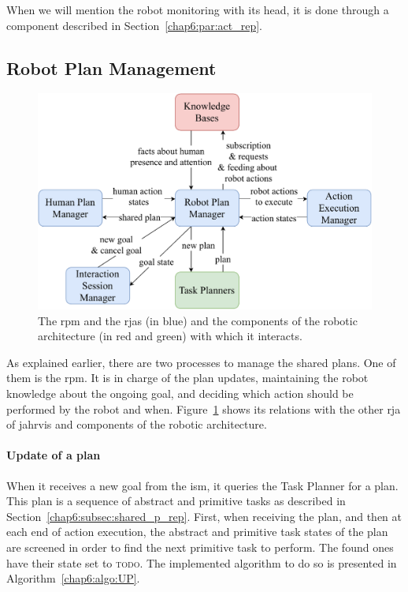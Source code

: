 \documentclass[a4paper,11pt,twoside]{StyleThese}
\begin{document}
When we will mention the robot monitoring with its head, it is done through a component described in Section~\ref{chap6:par:act_rep}.

\subsection{Robot Plan Management}\label{chap6:subsec:robot_plan}

\begin{figure}[!hbt]
	\centering
	\includegraphics[width=0.85\linewidth]{figures/chapter2/robot_manager_zoom.pdf}
	\caption{The \acrlong{rpm} and the \acrshort{rja}s (in blue) and the components of the robotic architecture (in red and green) with which it interacts.}
	\label{chap6:fig:rob_manager_zoom}
\end{figure}

As explained earlier, there are two processes to manage the shared plans. One of them is the \acrfull{rpm}. It is in charge of the plan updates, maintaining the robot knowledge about the ongoing goal, and deciding which action should be performed by the robot and when. Figure~\ref{chap6:fig:rob_manager_zoom} shows its relations with the other \acrshort{rja} of \acrshort{jahrvis} and components of the robotic architecture.

\paragraph{Update of a plan}
When it receives a new goal from the \acrlong{ism}, it queries the Task Planner for a plan. This plan is a sequence of abstract and primitive tasks as described in Section~\ref{chap6:subsec:shared_p_rep}. First, when receiving the plan, and then at each end of action execution, the abstract and primitive task states of the plan are screened in order to find the next primitive task to perform. The found ones have their state set to \textsc{todo}. The implemented algorithm to do so is presented in Algorithm~\ref{chap6:algo:UP}. 
\end{document}

